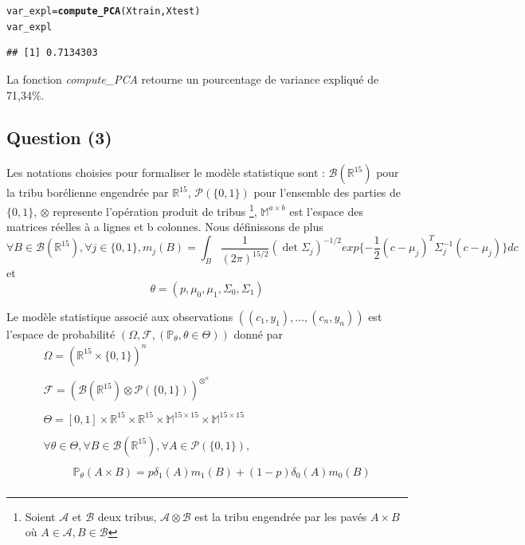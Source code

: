 \documentclass[10pt,a4paper]{report}\usepackage[]{graphicx}\usepackage[]{color}
\makeatletter
\newcommand{\hlstd}[1]{\textcolor[rgb]{0.345,0.345,0.345}{#1}}%
\newcommand{\hlkwb}[1]{\textcolor[rgb]{0.69,0.353,0.396}{#1}}%
\newcommand{\hlkwd}[1]{\textcolor[rgb]{0.737,0.353,0.396}{\textbf{#1}}}%
\newenvironment{kframe}{%
 \def\at@end@of@kframe{}%
 \ifinner\ifhmode%
  \def\at@end@of@kframe{\end{minipage}}%
  \begin{minipage}{\columnwidth}%
 \fi\fi%
 \def\FrameCommand##1{\hskip\@totalleftmargin \hskip-\fboxsep
 \colorbox{shadecolor}{##1}\hskip-\fboxsep
     \hskip-\linewidth \hskip-\@totalleftmargin \hskip\columnwidth}%
 \MakeFramed {\advance\hsize-\width
   \@totalleftmargin\z@ \linewidth\hsize
   \@setminipage}}%
 {\par\unskip\endMakeFramed%
 \at@end@of@kframe}
\newenvironment{knitrout}{}{} %
\makeatother
\begin{document}
\begin{knitrout}
\color{fgcolor}\begin{kframe}
\begin{alltt}
\hlstd{var_expl} \hlkwb{=} \hlkwd{compute_PCA}\hlstd{(Xtrain,Xtest)}
\hlstd{var_expl}
\end{alltt}
\begin{verbatim}
## [1] 0.7134303
\end{verbatim}
\end{kframe}
\end{knitrout}

La fonction \emph{compute\_PCA} retourne un pourcentage de variance expliqué de 71,34\%.

\subsection{Question (3)}

Les notations choisies pour formaliser le modèle statistique sont : \(\mathcal{B}(\mathbb{R}^{15})\) pour la tribu borélienne engendrée par \(\mathbb{R}^{15}\), \(\mathcal{P}(\{0,1\})\) pour l'ensemble des parties de $\{0,1\}$, $\otimes$ represente l'opération produit de tribus \footnote{Soient $\mathcal{A}$ et $\mathcal{B}$ deux tribus, $\mathcal{A} \otimes \mathcal{B}$ est la tribu engendrée par les pavés $A \times B$ où $A \in \mathcal{A}, B \in \mathcal{B}$}, $\mathbb{M}^{a \times b}$ est l'espace des matrices réelles à a lignes et b colonnes. Nous définissons de plus \[\forall B \in \mathcal{B}(\mathbb{R}^{15}), \forall j \in \{0,1\}, m_j(B) = \int_B \frac{1}{(2\pi)^{15/2}}(\det\Sigma_j)^{-1/2}exp\{-\frac{1}{2}(c-\mu_j)^T\Sigma_j^{-1} (c-\mu_j)\}dc\] et \[ \theta = (p, \mu_0, \mu_1, \Sigma_0, \Sigma_1)\]

Le modèle statistique associé aux observations $((c_1,y_1), \ldots, (c_n,y_n))$ est l'espace de probabilité $(\Omega, \mathcal{F}, (\mathbb{P}_{\theta}, \theta \in \Theta))$ donné par  \\
$$
\begin{array}{lcl}
\Omega = (\mathbb{R}^{15} \times \{0,1\})^n \\ \\
\mathcal{F} = (\mathcal{B}(\mathbb{R}^{15}) \otimes \mathcal{P}(\{0,1\}))^{\otimes^n} \\ \\
\Theta = [0,1] \times \mathbb{R}^{15} \times \mathbb{R}^{15} \times \mathbb{M}^{15 \times 15} \times \mathbb{M}^{15 \times 15} \\ \\
\forall \theta \in \Theta, \forall B \in \mathcal{B}(\mathbb{R}^{15}), \forall A \in
\mathcal{P}(\{0,1\}),  \\ \\
~~~~~~~~~~~~ \mathbb{P}_{\theta}(A \times B) = p\delta_1(A) m_1(B) + (1-p)\delta_0(A) m_0(B) \\
\end{array}
$$
\end{document}

